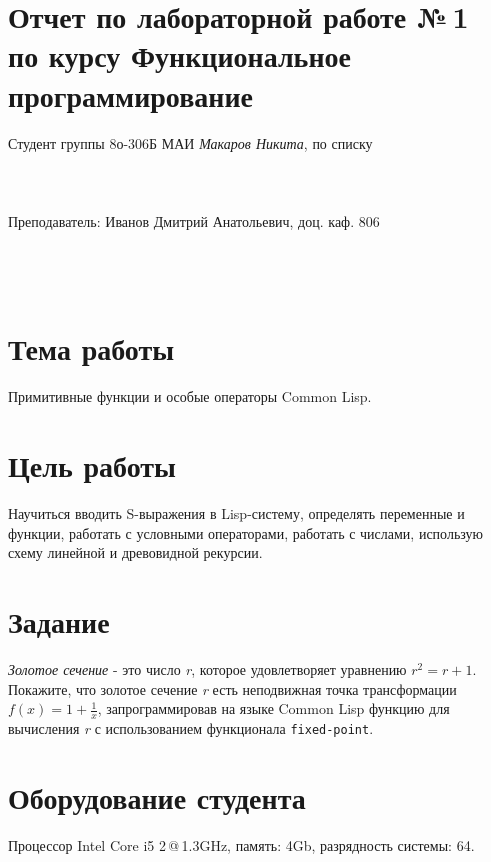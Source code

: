 \documentclass[a4paper, 12pt]{article}
\begin{document}
\section*{Отчет по лабораторной работе №\,1 
\\по курсу \guillemotleft  Функциональное программирование\guillemotright}

\begin{flushright}
Студент группы 8о-306Б МАИ \textit{Макаров Никита},  по списку \\
 \\
 \\
\ \\
Преподаватель: Иванов Дмитрий Анатольевич, доц. каф. 806 \\
 \\
 \\
 \\

\end{flushright}


\section{Тема работы}
Примитивные функции и особые операторы Common Lisp.


\section{Цель работы}
Научиться вводить S-выражения в Lisp-систему, определять переменные и функции, работать с условными операторами, работать с числами, использую схему линейной и древовидной рекурсии.


\section{Задание}
\textit{Золотое сечение} - это число \textit{r}, которое удовлетворяет уравнению
\(r^{2} = r + 1\). \\Покажите, что золотое сечение \textit{r} есть неподвижная точка трансформации\\ \(f(x) = 1 + \frac{1}{x}\), запрограммировав на языке Common Lisp функцию для вычисления \textit{r} с использованием функционала {\tt fixed-point}.


\section{Оборудование студента}
Процессор Intel Core i5 2\,@\,1.3GHz, память: 4Gb, разрядность системы: 64.
\end{document}
